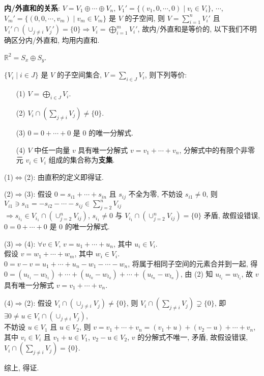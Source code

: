 \documentclass{note}
\begin{document}
\textbf{内/外直和的关系}:
$V=V_1\oplus\cdots\oplus V_n$, $V_1'=\{(v_1,0,\cdots,0)\mid v_i\in V_i\}$, $\cdots$, $V_m'=\{(0,0,\cdots,v_m)\mid v_m\in V_m\}$ 是 $V$ 的子空间, 则 $V=\sum_{i=1}^nV_i'$ 且 $V_i'\cap(\cup_{j\neq i}V_j')=\{0\}\Longrightarrow V_i=\bigoplus_{i=1}^mV_i'$, 故内/外直和是等价的, 以下我们不明确区分内/外直和, 均用内直和.

\begin{eg}
    $\mathbb{R}^2=S_x\oplus S_y$.
\end{eg}

\begin{thm}[(课本定理 1.5)]
    $\{V_i\mid i\in J\}$ 是 $V$ 的子空间集合, $V=\sum_{i\in J}V_i$, 则下列等价:
    \begin{itemize}
        \item[(1)] $V=\bigoplus_{i\in J}V_i$.
        \item[(2)] $V_i\cap(\sum_{j\neq i}V_j)\neq\{0\}$.
        \item[(3)] $0=0+\cdots+0$ 是 $0$ 的唯一分解式.
        \item[(4)] $V$ 中任一向量 $v$ 具有唯一分解式 $v=v_1+\cdots+v_n$, 分解式中的有限个非零元 $v_i\in V_i$ 组成的集合称为\textbf{支集}.
    \end{itemize}
\end{thm}
\begin{pf}
    (1)$\Longleftrightarrow$(2): 由直积的定义即得证.

    (2)$\Longrightarrow$(3): 假设 $0=s_{i1}+\cdots+s_{in}$ 且 $s_{ij}$ 不全为零, 不妨设 $s_{i1}\neq 0$, 则 $V_{i1}\ni s_{i1}=-s_{i2}-\cdots-s_{ij}\in\sum_{j=2}^nV_{ij}$\\
    $\Longrightarrow s_{i_1}\in V_{i_1}\cap(\cup_{j=2}^nV_{ij})$, $s_{i_1}\neq 0$ 与 $V_{i_1}\cap(\cup_{j=2}^nV_{ij})=\{0\}$ 矛盾, 故假设错误, $0=0+\cdots+0$ 是 $0$ 的唯一分解式.

    (3)$\Longrightarrow$(4): $\forall v\in V$, $v=u_1+\cdots+u_n$, 其中 $u_i\in V_i$.\\
    假设 $v=w_1+\cdots+w_m$, 其中 $w_i\in V_i$.\\
    $0=v-v=u_1+\cdots+u_n-w_1-\cdots-w_n$, 将属于相同子空间的元素合并到一起, 得 $0=(u_{t_1}-w_{t_1})+\cdots+(u_{t_k}-w_{t_k})+\cdots+(u_{t_n}-w_{t_n})$, 由 (2) 知 $u_{t_i}=w_{t_i}$, 故 $v$ 具有唯一分解式 $v=v_1+\cdots+v_n$.

    (4)$\Longrightarrow$(2): 假设 $V_i\cap(\cup_{j\neq i}V_j)\neq\{0\}$, 则 $V_i\cap(\sum_{j\neq i}V_j)\supsetneq\{0\}$, 即 $\exists 0\neq u\in V_i\cap(\cup_{j\neq i}V_j)$,\\
    不妨设 $u\in V_1$ 且 $u\in V_2$, 则 $v=v_1+\cdots+v_n=(v_1+u)+(v_2-u)+\cdots+v_n$, 其中 $v_i\in V_i$ 且 $v_1+u\in V_1$, $v_2-u\in V_2$, $v$ 的分解式不唯一, 矛盾, 故假设错误, $V_i\cap(\sum_{j\neq i}V_j)=\{0\}$.

    综上, 得证.
\end{pf}
\end{document}
